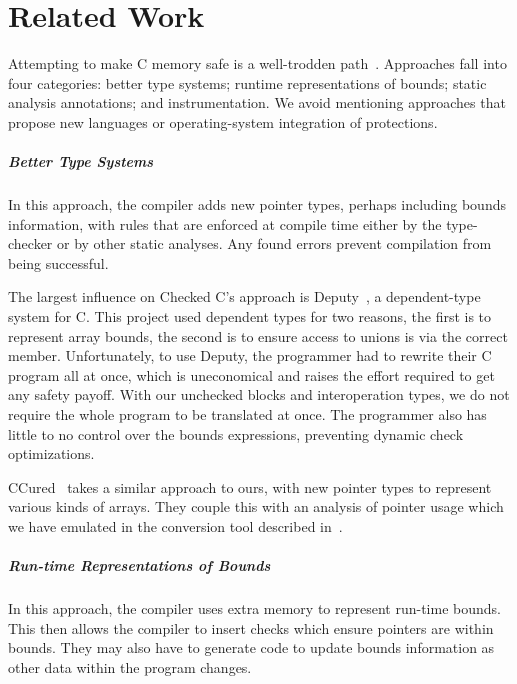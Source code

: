 \chapter{Related Work}
\label{sec:related-work}

Attempting to make C memory safe is a well-trodden
path~\cite{Szekeres:2013:SEW:2497621.2498101}. Approaches fall into
four categories: better type systems; runtime representations of
bounds; static analysis annotations; and instrumentation. We avoid
mentioning approaches that propose new languages or operating-system
integration of protections.

\paragraph{Better Type Systems} In this approach, the compiler adds
new pointer types, perhaps including bounds information, with rules
that are enforced at compile time either by the type-checker or by
other static analyses. Any found errors prevent compilation from being
successful.

The largest influence on Checked C's approach is
Deputy~\cite{Condit2007}, a dependent-type system for C. This project
used dependent types for two reasons, the first is to represent array
bounds, the second is to ensure access to unions is via the correct
member. Unfortunately, to use Deputy, the programmer had to rewrite
their C program all at once, which is uneconomical and raises the
effort required to get any safety payoff. With our unchecked blocks
and interoperation types, we do not require the whole program to be
translated at once. The programmer also has little to no control over
the bounds expressions, preventing dynamic check optimizations.

CCured~\cite{Necula2005} takes a similar approach to ours, with new
pointer types to represent various kinds of arrays. They couple this
with an analysis of pointer usage which we have emulated in the
conversion tool described in~\cite{ruef2017draft}.

\paragraph{Run-time Representations of Bounds} In this approach, the
compiler uses extra memory to represent run-time bounds. This then
allows the compiler to insert checks which ensure pointers are within
bounds. They may also have to generate code to update bounds
information as other data within the program changes.

